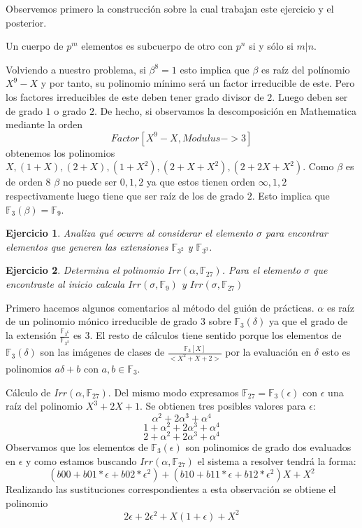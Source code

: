 \documentclass{article}
\theoremstyle{theorem-style}  %
\theoremstyle{definition-style}
\theoremstyle{example-style}
\newtheorem{exercise}{Ejercicio}[section]
\begin{document}
Observemos primero la construcción sobre la cual trabajan este ejercicio y el posterior. 


Un cuerpo de $p^m$ elementos es subcuerpo de otro con $p^n$ si y sólo si $m|n$. 

Volviendo a nuestro problema, si $\beta^8 = 1$ esto implica que $\beta$ es raíz del polínomio $X^9 - X$ y por tanto, su polinomio mínimo será un factor irreducible de este. Pero los factores irreducibles de este deben tener grado divisor de $2$. Luego deben ser de grado $1$ o grado $2$. De hecho, si observamos la descomposición en Mathematica mediante la orden $$Factor[X^9-X,Modulus->3]$$ obtenemos los polinomios $X,(1 + X),(2 + X),(1 + X^2),(2 + X + X^2),(2 + 2 X + X^2)$. Como $\beta$ es de orden $8$ $\beta$ no puede ser $0,1,2$ ya que estos tienen orden $\infty,1,2$ respectivamente luego tiene que ser raíz de los de grado $2$. Esto implica que $\mathbb{F}_3(\beta) = \mathbb{F}_9$. 

\begin{exercise}
	Analiza qué ocurre al considerar el elemento $\sigma$ para encontrar elementos que generen las extensiones $\mathbb{F}_{3^2}$ y $\mathbb{F}_{3^3}$.
\end{exercise}

\begin{exercise}
	Determina el polinomio $Irr(\alpha,\mathbb{F}_{27})$. Para el elemento $\sigma$ que encontraste al inicio calcula $Irr(\sigma,\mathbb{F}_9)$ y $Irr(\sigma,\mathbb{F}_{27})$
\end{exercise}

Primero hacemos algunos comentarios al método del guión de prácticas. $\alpha$ es raíz de un polinomio mónico irreducible de grado 3 sobre $\mathbb{F}_3(\delta)$ ya que el grado de la extensión $\frac{\mathbb{F}_{3^6}}{\mathbb{F}_{3^2}}$ es 3. El resto de cálculos tiene sentido porque los elementos de $\mathbb{F}_3(\delta)$ son las imágenes de clases de $\frac{\mathbb{F}_3[X]}{<X^2+X+2>}$ por la evaluación en $\delta$ esto es polinomios $a\delta + b$ con $a,b \in \mathbb{F}_3$. 

Cálculo de $Irr(\alpha,\mathbb{F}_{27})$. Del mismo modo expresamos $\mathbb{F}_{27} = \mathbb{F}_3(\epsilon)$ con $\epsilon$ una raíz del polinomio $X^3 + 2X + 1$.  Se obtienen tres posibles valores para $\epsilon$: $$\alpha^2+2\alpha^3+\alpha^4$$ $$1+\alpha^2+2\alpha^3+\alpha^4$$ $$2+\alpha^2+2\alpha^3+\alpha^4$$ Observamos que los elementos de $\mathbb{F}_3(\epsilon)$ son polinomios de grado dos evaluados en $\epsilon$ y como estamos buscando $Irr(\alpha,\mathbb{F}_{27})$ el sistema a resolver tendrá la forma: $$(b00 + b01*\epsilon + b02*\epsilon^2) + (b10 + b11*\epsilon + b12*\epsilon^2) X + X^2$$ Realizando las sustituciones correspondientes a esta observación se obtiene el polinomio $$2 \epsilon + 2 \epsilon^2 + X (1 + \epsilon) + X^2$$
\end{document}
